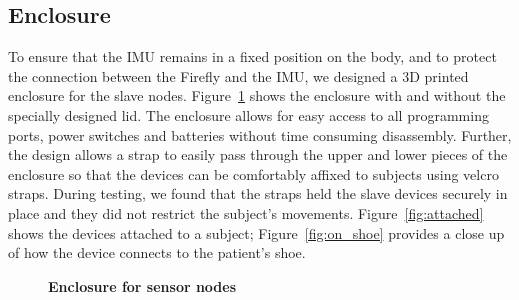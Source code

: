 \documentclass[conference]{IEEEtran}
\begin{document}
\subsection{Enclosure} 
To ensure that the IMU remains in a fixed position on the body, and to protect the
connection between the Firefly and the IMU, we designed a 3D printed enclosure for the
slave nodes. Figure~\ref{fig:box} shows the enclosure with and without the specially designed
lid. The enclosure allows for easy access to all programming ports, power switches and
batteries without time consuming disassembly. Further, the design allows a strap to easily
pass through the upper and lower pieces of the enclosure so that the devices can be
comfortably affixed to subjects using velcro straps. During testing, we found that the
straps held the slave devices securely in place and they did not restrict the subject's
movements. Figure~\ref{fig:attached} shows the devices attached to a subject;
Figure~\ref{fig:on_shoe} provides a close up of how the device connects to the patient's
shoe.  
\begin{figure}[h]
  \centering
  \caption{{\bf Enclosure for sensor nodes}
  \label{fig:box}
  }
\end{figure}
\end{document}
